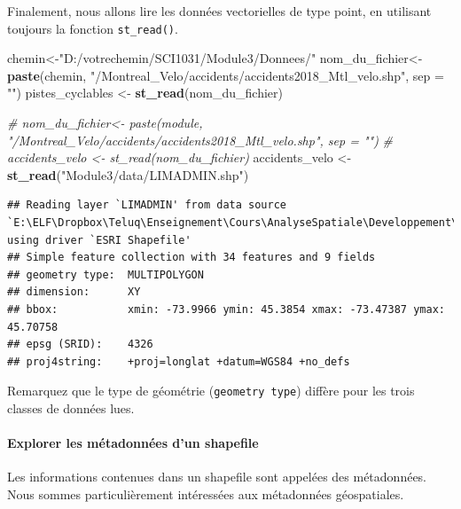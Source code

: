 \documentclass[]{article}
\newenvironment{Shaded}{\begin{snugshade}}{\end{snugshade}}
\newcommand{\KeywordTok}[1]{\textcolor[rgb]{0.13,0.29,0.53}{\textbf{#1}}}
\newcommand{\DataTypeTok}[1]{\textcolor[rgb]{0.13,0.29,0.53}{#1}}
\newcommand{\StringTok}[1]{\textcolor[rgb]{0.31,0.60,0.02}{#1}}
\newcommand{\CommentTok}[1]{\textcolor[rgb]{0.56,0.35,0.01}{\textit{#1}}}
\newcommand{\NormalTok}[1]{#1}
\let\oldparagraph\paragraph
\renewcommand{\paragraph}[1]{\oldparagraph{#1}\mbox{}}
\begin{document}
Finalement, nous allons lire les données vectorielles de type point, en
utilisant toujours la fonction \texttt{st\_read()}.

\begin{Shaded}
\begin{Highlighting}[]
\NormalTok{chemin<-}\StringTok{"D:/votrechemin/SCI1031/Module3/Donnees/"}
\NormalTok{nom_du_fichier<-}\StringTok{ }\KeywordTok{paste}\NormalTok{(chemin, }\StringTok{"/Montreal_Velo/accidents/accidents2018_Mtl_velo.shp"}\NormalTok{, }\DataTypeTok{sep =} \StringTok{""}\NormalTok{)}
\NormalTok{pistes_cyclables <-}\StringTok{ }\KeywordTok{st_read}\NormalTok{(nom_du_fichier)}
\end{Highlighting}
\end{Shaded}

\begin{Shaded}
\begin{Highlighting}[]
\CommentTok{# nom_du_fichier<- paste(module, "/Montreal_Velo/accidents/accidents2018_Mtl_velo.shp", sep = "")}
\CommentTok{# accidents_velo <- st_read(nom_du_fichier)}
\NormalTok{accidents_velo <-}\StringTok{ }\KeywordTok{st_read}\NormalTok{(}\StringTok{"Module3/data/LIMADMIN.shp"}\NormalTok{)}
\end{Highlighting}
\end{Shaded}

\begin{verbatim}
## Reading layer `LIMADMIN' from data source `E:\ELF\Dropbox\Teluq\Enseignement\Cours\AnalyseSpatiale\Developpement\Structure_test\sci1031\Module3\data\LIMADMIN.shp' using driver `ESRI Shapefile'
## Simple feature collection with 34 features and 9 fields
## geometry type:  MULTIPOLYGON
## dimension:      XY
## bbox:           xmin: -73.9966 ymin: 45.3854 xmax: -73.47387 ymax: 45.70758
## epsg (SRID):    4326
## proj4string:    +proj=longlat +datum=WGS84 +no_defs
\end{verbatim}

Remarquez que le type de géométrie (\texttt{geometry\ type}) diffère
pour les trois classes de données lues.

\paragraph{Explorer les métadonnées d'un
shapefile}\label{explorer-les-muxe9tadonnuxe9es-dun-shapefile}

Les informations contenues dans un shapefile sont appelées des
métadonnées. Nous sommes particulièrement intéressées aux métadonnées
géospatiales.
\end{document}

